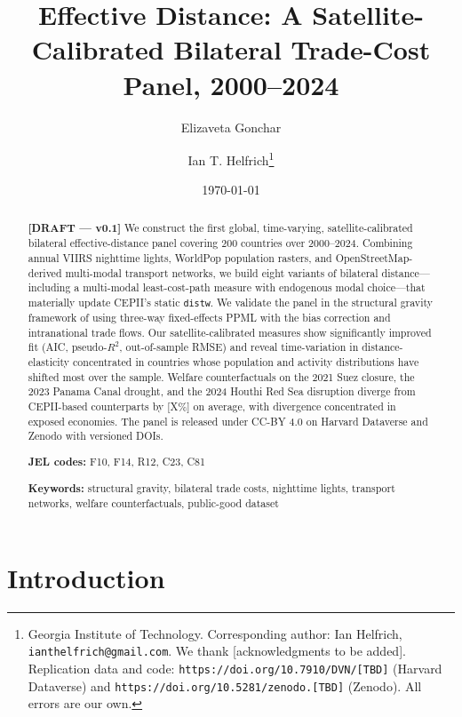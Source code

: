 \documentclass[11pt, a4paper]{article}
\title{Effective Distance: A Satellite-Calibrated Bilateral Trade-Cost Panel, 2000--2024}
\author[1]{Elizaveta Gonchar}
\author[1]{Ian T. Helfrich\thanks{Georgia Institute of Technology. Corresponding author: Ian Helfrich, \texttt{ianthelfrich@gmail.com}. We thank [acknowledgments to be added]. Replication data and code: \texttt{https://doi.org/10.7910/DVN/[TBD]} (Harvard Dataverse) and \texttt{https://doi.org/10.5281/zenodo.[TBD]} (Zenodo). All errors are our own.}}
\affil[1]{Georgia Institute of Technology}
\date{\today}
\begin{document}
\maketitle

\begin{abstract}
\noindent
\textbf{[DRAFT --- v0.1]}
We construct the first global, time-varying, satellite-calibrated bilateral effective-distance panel covering 200 countries over 2000--2024. Combining annual VIIRS nighttime lights, WorldPop population rasters, and OpenStreetMap-derived multi-modal transport networks, we build eight variants of bilateral distance---including a multi-modal least-cost-path measure with endogenous modal choice---that materially update CEPII's static \texttt{distw}. We validate the panel in the structural gravity framework of \citet{yotov_piermartini_monteiro_larch_2016} using three-way fixed-effects PPML with the \citet{weidner_zylkin_2021} bias correction and intranational trade flows. Our satellite-calibrated measures show significantly improved fit (AIC, pseudo-$R^2$, out-of-sample RMSE) and reveal time-variation in distance-elasticity concentrated in countries whose population and activity distributions have shifted most over the sample. Welfare counterfactuals on the 2021 Suez closure, the 2023 Panama Canal drought, and the 2024 Houthi Red Sea disruption diverge from CEPII-based counterparts by [X\%] on average, with divergence concentrated in exposed economies. The panel is released under CC-BY 4.0 on Harvard Dataverse and Zenodo with versioned DOIs.

\medskip

\noindent \textbf{JEL codes:} F10, F14, R12, C23, C81

\noindent \textbf{Keywords:} structural gravity, bilateral trade costs, nighttime lights, transport networks, welfare counterfactuals, public-good dataset
\end{abstract}

\section{Introduction}
\label{sec:intro}
\end{document}
